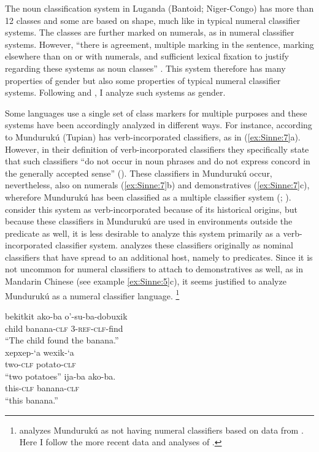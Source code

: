 \documentclass[output=collectionpaper]{langsci/langscibook}
\begin{document}
The noun classification system in Luganda (Bantoid; Niger-Congo) has more than 12 classes and some are based on shape, much like in typical numeral classifier systems. The classes are further marked on numerals, as in numeral classifier systems. However, ``there is agreement, multiple marking in the sentence, marking elsewhere than on or with numerals, and sufficient lexical fixation to justify regarding these systems as noun classes'' \citep[136]{Nichols1992}. This system therefore has many properties of gender but also some properties of typical numeral classifier systems. Following \citet{Nichols1992} and \citet{Corbett2013}, I analyze such systems as gender.

Some languages use a single set of class markers for multiple purposes and these systems have been accordingly analyzed in different ways. For instance, according to \citet[261]{Derbyshire1990} Mundurukú (Tupian) has verb\hyp{}incorporated classifiers, as in (\ref{ex:Sinne:7}a). However, in their definition of verb-incorporated classifiers they specifically state that such classifiers ``do not occur in noun phrases and do not express concord in the generally accepted sense'' (\citealt[245]{Derbyshire1990}). These classifiers in Mundurukú occur, nevertheless, also on numerals (\ref{ex:Sinne:7}b) and demonstratives (\ref{ex:Sinne:7}c), wherefore Mundurukú has been classified as a multiple classifier system (\citealt{Aikhenvald2000}; \citealt{Passer2016a}). \citet{Derbyshire1990} consider this system as verb-incorporated because of its historical origins, but because these classifiers in Mundurukú are used in environments outside the predicate as well, it is less desirable to analyze this system primarily as a verb-incorporated classifier system. \citet{Passer2016a} analyzes these classifiers originally as nominal classifiers that have spread to an additional host, namely to predicates. Since it is not uncommon for numeral classifiers to attach to demonstratives as well, as in Mandarin Chinese (see example \ref{ex:Sinne:5}c), it seems justified to analyze Mundurukú as a numeral classifier language.%
\footnote{\citet{Gil2013} analyzes Mundurukú as not having numeral classifiers based on data from \citet{Derbyshire1990}. Here I follow the more recent data and analyses of \citet{Passer2016a}.}

\ea
\label{ex:Sinne:7}
\begin{xlist}
\ex
\gll bekitkit ako-ba o'-su-ba-dobuxik\\
child banana-\textsc{clf} \textsc{3-ref-clf}{}-find \\
\glt ``The child found the banana.''\\
\ex
\gll xepxep-`a wexik-`a\\
two-\textsc{clf} potato-\textsc{clf} \\
\glt ``two potatoes''
\ex
\gll ija-ba ako-ba.\\
this-\textsc{clf} banana-\textsc{clf}\\
\glt ``this banana.''\\
\end{xlist}
\z
\end{document}
